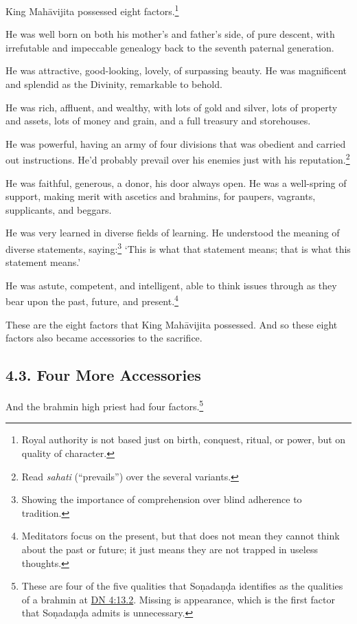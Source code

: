 \documentclass[12pt,openany]{book}%
\begin{document}
King \textsanskrit{Mahāvijita} possessed eight factors.\footnote{Royal authority is not based just on birth, conquest, ritual, or power, but on quality of character. } 

He was well born on both his mother’s and father’s side, of pure descent, with irrefutable and impeccable genealogy back to the seventh paternal generation. 

He was attractive, good-looking, lovely, of surpassing beauty. He was magnificent and splendid as the Divinity, remarkable to behold. 

He was rich, affluent, and wealthy, with lots of gold and silver, lots of property and assets, lots of money and grain, and a full treasury and storehouses. 

He was powerful, having an army of four divisions that was obedient and carried out instructions. He’d probably prevail over his enemies just with his reputation.\footnote{Read \textit{sahati} (“prevails”) over the several variants. } 

He was faithful, generous, a donor, his door always open. He was a well-spring of support, making merit with ascetics and brahmins, for paupers, vagrants, supplicants, and beggars. 

He was very learned in diverse fields of learning. He understood the meaning of diverse statements, saying:\footnote{Showing the importance of comprehension over blind adherence to tradition. } ‘This is what that statement means; that is what this statement means.’ 

He was astute, competent, and intelligent, able to think issues through as they bear upon the past, future, and present.\footnote{Meditators focus on the present, but that does not mean they cannot think about the past or future; it just means they are not trapped in useless thoughts. } 

These are the eight factors that King \textsanskrit{Mahāvijita} possessed. And so these eight factors also became accessories to the sacrifice. 

\subsection*{4.3. Four More Accessories }

And the brahmin high priest had four factors.\footnote{These are four of the five qualities that \textsanskrit{Soṇadaṇḍa} identifies as the qualities of a brahmin at \href{https://suttacentral.net/dn4/en/sujato\#13.2}{DN 4:13.2}. Missing is appearance, which is the first factor that \textsanskrit{Soṇadaṇḍa} admits is unnecessary. } 
\end{document}
